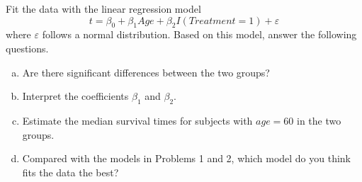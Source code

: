 \documentclass{elegantbook}
\begin{document}
\begin{exercise*}[3]
    Fit the data with the linear regression model
    \[t=\beta_0+\beta_1 Age +\beta_2 I(Treatment=1)+\varepsilon\]
    where $\varepsilon$ follows a normal distribution. Based on this model, answer the following questions. 
    \begin{enumerate}[(a)]
        \item Are there significant differences between the two groups?
        \item Interpret the coefficients $\beta_1$ and $\beta_2$. 
        \item Estimate the median survival times for subjects with $age=60$ in the two groups. 
        \item Compared with the models in Problems 1 and 2, which model do you think fits
        the data the best?
    \end{enumerate}
\end{exercise*}
\end{document}
